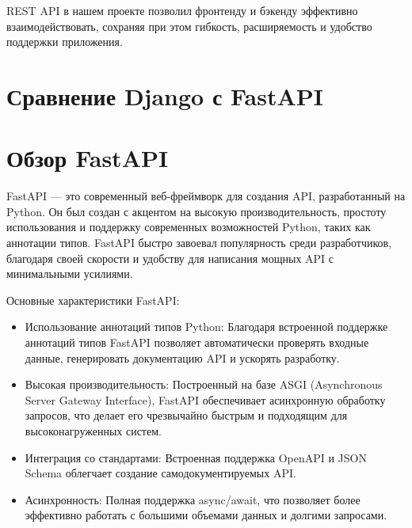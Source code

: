 REST API в нашем проекте позволил фронтенду и бэкенду эффективно взаимодействовать, сохраняя при этом гибкость, расширяемость и удобство поддержки приложения.

\section{Сравнение Django с FastAPI}

\section{Обзор FastAPI}
FastAPI — это современный веб-фреймворк для создания API, разработанный на Python. Он был создан с акцентом на высокую производительность, простоту использования и поддержку современных возможностей Python, таких как аннотации типов. FastAPI быстро завоевал популярность среди разработчиков, благодаря своей скорости и удобству для написания мощных API с минимальными усилиями.

Основные характеристики FastAPI:
\begin{itemize}
    \item Использование аннотаций типов Python: Благодаря встроенной поддержке аннотаций типов FastAPI позволяет автоматически проверять входные данные, генерировать документацию API и ускорять разработку.
    \item Высокая производительность: Построенный на базе ASGI (Asynchronous Server Gateway Interface), FastAPI обеспечивает асинхронную обработку запросов, что делает его чрезвычайно быстрым и подходящим для высоконагруженных систем.
    \item Интеграция со стандартами: Встроенная поддержка OpenAPI и JSON Schema облегчает создание самодокументируемых API.
    \item Асинхронность: Полная поддержка async/await, что позволяет более эффективно работать с большими объемами данных и долгими запросами.
\end{itemize}

